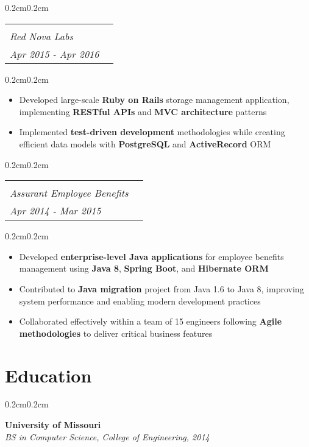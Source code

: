 \documentclass[10pt, letterpaper]{article}
\makeatletter
\newenvironment{highlights}{
    \begin{itemize}[
        topsep=0.10 cm,
        parsep=0.10 cm,
        partopsep=0pt,
        itemsep=0pt,
        leftmargin=0.4 cm + 10pt
    ]
}{
    \end{itemize}
}
\newenvironment{onecolentry}{
    \begin{adjustwidth}{0.2cm}{0.2cm}
}{
    \end{adjustwidth}
}
\newcommand{\jobentry}[4]{
    \begin{onecolentry}
        \noindent
        \begin{tabularx}{\textwidth}{@{}X>{\raggedleft\arraybackslash}p{3cm}@{\hspace{0.2cm}}}
            \begin{tabular}[t]{@{}l@{}}
                \textbf{#1}\\
                \textit{#2}
            \end{tabular} &
            \begin{tabular}[t]{@{}r@{}}
                #4\\
                \textit{#3}
            \end{tabular}
        \end{tabularx}
    \end{onecolentry}
}
\newcommand{\educationentry}[2]{
    \begin{onecolentry}
        \noindent
        \textbf{#1}\\
        \textit{#2}
    \end{onecolentry}
}
\makeatother
\begin{document}
    \vspace{0.3cm}

    \jobentry{Ruby Software Developer}{Red Nova Labs}{Apr 2015 - Apr 2016}{Kansas City, KS}

    \vspace{0.10cm}
    \begin{onecolentry}
        \begin{highlights}
            \item Developed large-scale \textbf{Ruby on Rails} storage management application, implementing \textbf{RESTful APIs} and \textbf{MVC architecture} patterns
            \item Implemented \textbf{test-driven development} methodologies while creating efficient data models with \textbf{PostgreSQL} and \textbf{ActiveRecord} ORM
        \end{highlights}
    \end{onecolentry}
    
    \vspace{0.3cm}

    \jobentry{Java Backend Developer}{Assurant Employee Benefits}{Apr 2014 - Mar 2015}{Kansas City, MO}

    \vspace{0.10cm}
    \begin{onecolentry}
        \begin{highlights}
            \item Developed \textbf{enterprise-level Java applications} for employee benefits management using \textbf{Java 8}, \textbf{Spring Boot}, and \textbf{Hibernate ORM}
            \item Contributed to \textbf{Java migration} project from Java 1.6 to Java 8, improving system performance and enabling modern development practices
            \item Collaborated effectively within a team of 15 engineers following \textbf{Agile methodologies} to deliver critical business features
        \end{highlights}
    \end{onecolentry}

    \section{Education}
    \educationentry{University of Missouri}{BS in Computer Science, College of Engineering, 2014}
\end{document}
